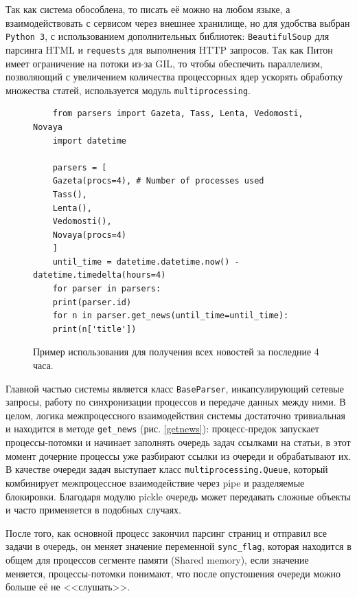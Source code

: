 \documentclass[a4paper, 14pt]{extarticle}
\begin{document}
Так как система обособлена, то писать её можно на любом языке, а взаимодействовать с сервисом через внешнее хранилище, но для удобства выбран \texttt{Python 3}, с использованием дополнительных библиотек: \texttt{BeautifulSoup} для парсинга HTML и \texttt{requests} для выполнения HTTP запросов. Так как Питон имеет ограничение на потоки из-за GIL, то чтобы обеспечить параллелизм, позволяющий с увеличением количества процессорных ядер ускорять обработку множества статей, используется модуль \texttt{multiprocessing}.

\begin{figure}
	\centering
	\begin{verbatim}
	from parsers import Gazeta, Tass, Lenta, Vedomosti, Novaya
	import datetime
	
	parsers = [
	Gazeta(procs=4), # Number of processes used
	Tass(),
	Lenta(),
	Vedomosti(),
	Novaya(procs=4)
	]
	until_time = datetime.datetime.now() - datetime.timedelta(hours=4)
	for parser in parsers:
	print(parser.id)
	for n in parser.get_news(until_time=until_time):
	print(n['title'])
	\end{verbatim}
	\caption{Пример использования для получения всех новостей за последние 4 часа.}
	\label{example}
\end{figure}

Главной частью системы является класс \texttt{BaseParser}, инкапсулирующий сетевые запросы, работу по синхронизации процессов и передаче данных между ними. В целом, логика межпроцессного взаимодействия системы достаточно тривиальная и находится в методе \texttt{get\_news} (рис. \ref{getnews}): процесс-предок запускает процессы-потомки и начинает заполнять очередь задач ссылками на статьи, в этот момент дочерние процессы уже разбирают ссылки из очереди и обрабатывают их. В качестве очереди задач выступает класс \texttt{multiprocessing.Queue}, который комбинирует межпроцессное взаимодействие через pipe и разделяемые блокировки. Благодаря модулю pickle очередь может передавать сложные объекты и часто применяется в подобных случаях. 

После того, как основной процесс закончил парсинг страниц и отправил все задачи в очередь, он меняет значение переменной \texttt{sync\_flag}, которая находится в общем для процессов сегменте памяти (Shared memory), если значение меняется, процессы-потомки понимают, что после опустошения очереди можно больше её не <<слушать>>.
\end{document}
